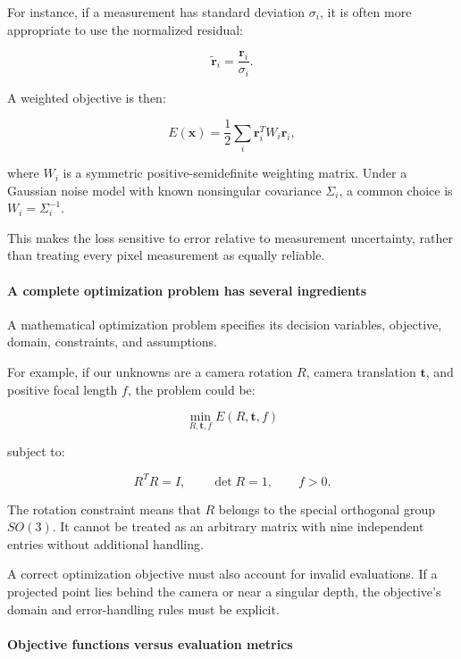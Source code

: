 For instance, if a measurement has standard deviation \(\sigma_i\), it is often more appropriate to use the normalized residual:

\[
\tilde{\mathbf r}_i= \frac{\mathbf r_i}{\sigma_i}.
\]

A weighted objective is then:

\[
E(\mathbf x)= \frac12\sum_i \mathbf r_i^TW_i\mathbf r_i,
\]

where \(W_i\) is a symmetric positive-semidefinite weighting matrix. Under a Gaussian noise model with known nonsingular covariance \(\Sigma_i\), a common choice is \(W_i=\Sigma_i^{-1}\).

This makes the loss sensitive to error relative to measurement uncertainty, rather than treating every pixel measurement as equally reliable.

\paragraph{A complete optimization problem has several ingredients}\label{02-foundations-ii-ch026-a-complete-optimization-problem-has-several-ingredients}

\hypertarget{02-foundations-ii-ch026-a-complete-optimization-problem-has-several-ingredients}{}

A mathematical optimization problem specifies its decision variables, objective, domain, constraints, and assumptions.

For example, if our unknowns are a camera rotation \(R\), camera translation \(\mathbf t\), and positive focal length \(f\), the problem could be:

\[
\min_{R,\mathbf t,f}E(R,\mathbf t,f)
\]

subject to:

\[
R^TR=I,\qquad \det R=1,\qquad f>0.
\]

The rotation constraint means that \(R\) belongs to the special orthogonal group \(SO(3)\). It cannot be treated as an arbitrary matrix with nine independent entries without additional handling.

A correct optimization objective must also account for invalid evaluations. If a projected point lies behind the camera or near a singular depth, the objective's domain and error-handling rules must be explicit.

\paragraph{Objective functions versus evaluation metrics}\label{02-foundations-ii-ch026-objective-functions-versus-evaluation-metrics}

